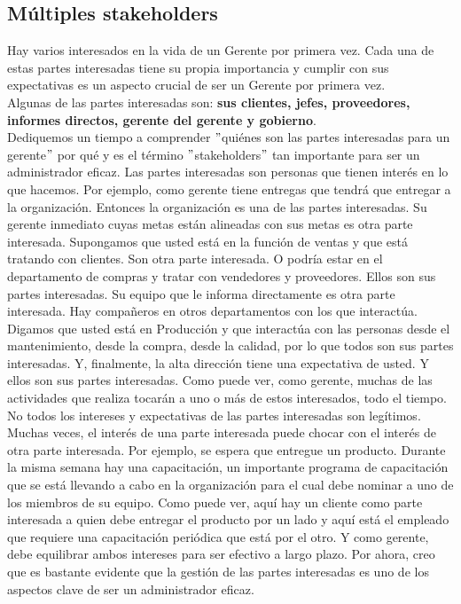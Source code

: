 \documentclass[10pt]{book}
\begin{document}
\subsection{Múltiples stakeholders}
Hay varios interesados en la vida de un Gerente por primera vez. Cada una de estas partes interesadas tiene su propia importancia y cumplir con sus expectativas es un aspecto crucial de ser un Gerente por primera vez.\\
Algunas de las partes interesadas son: \textbf{sus clientes, jefes, proveedores, informes directos, gerente del gerente y gobierno}.\\
Dediquemos un tiempo a comprender $"$quiénes son las partes interesadas para un gerente$"$ por qué y es el término $"$stakeholders$"$ tan importante para ser un administrador eficaz. Las partes interesadas son personas que tienen interés en lo que hacemos. Por ejemplo, como gerente tiene entregas que tendrá que entregar a la organización. Entonces la organización es una de las partes interesadas. Su gerente inmediato cuyas metas están alineadas con sus metas es otra parte interesada. Supongamos que usted está en la función de ventas y que está tratando con clientes. Son otra parte interesada. O podría estar en el departamento de compras y tratar con vendedores y proveedores. Ellos son sus partes interesadas. Su equipo que le informa directamente es otra parte interesada. Hay compañeros en otros departamentos con los que interactúa. Digamos que usted está en Producción y que interactúa con las personas desde el mantenimiento, desde la compra, desde la calidad, por lo que todos son sus partes interesadas. Y, finalmente, la alta dirección tiene una expectativa de usted. Y ellos son sus partes interesadas. Como puede ver, como gerente, muchas de las actividades que realiza tocarán a uno o más de estos interesados, todo el tiempo. No todos los intereses y expectativas de las partes interesadas son legítimos. Muchas veces, el interés de una parte interesada puede chocar con el interés de otra parte interesada. Por ejemplo, se espera que entregue un producto. Durante la misma semana hay una capacitación, un importante programa de capacitación que se está llevando a cabo en la organización para el cual debe nominar a uno de los miembros de su equipo. Como puede ver, aquí hay un cliente como parte interesada a quien debe entregar el producto por un lado y aquí está el empleado que requiere una capacitación periódica que está por el otro. Y como gerente, debe equilibrar ambos intereses para ser efectivo a largo plazo. Por ahora, creo que es bastante evidente que la gestión de las partes interesadas es uno de los aspectos clave de ser un administrador eficaz.
\end{document}
